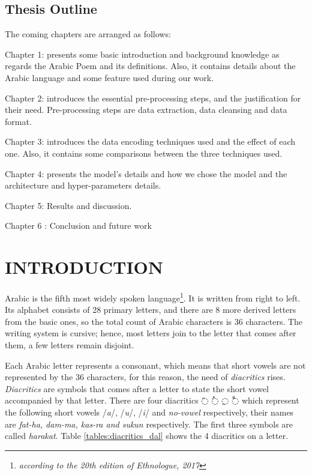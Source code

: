 
\section{Thesis Outline}

The coming chapters are arranged as follows:

Chapter 1: presents some basic introduction and  background knowledge as regards the Arabic Poem and its definitions. Also, it contains details about the Arabic language and some feature used during our work.
 
Chapter 2: introduces the essential pre-processing steps, and the justification for their need. Pre-processing steps are data extraction, data cleansing and data format.

Chapter 3: introduces the data encoding techniques used and the effect of each one. Also, it contains some comparisons between the three techniques used.

 Chapter 4: presents the model's details and how we chose the model and the architecture and hyper-parameters details.
 
 Chapter 5: Results and discussion.
 
 Chapter 6 : Conclusion and future work


 


\chapter{\uppercase{Introduction}}


Arabic is the fifth most widely spoken language\footnote{\textit{according to the
		20th edition of Ethnologue, 2017}}. It is written from right to left. Its
alphabet consists of 28 primary letters, and there are 8 more derived letters
from the basic ones, so the total count of Arabic characters is 36 characters.
The writing system is cursive; hence, most letters join to the letter that comes
after them, a few letters remain disjoint.

Each Arabic letter represents a consonant, which means that short vowels are not
represented by the 36 characters, for this reason, the need of \textit{diacritics}
rises. \textit{Diacritics} are symbols that comes after a letter to state the
short vowel accompanied by that letter. There are four diacritics \textarabic{◌َ} \textarabic{◌ُ}
\textarabic{◌ِ} \textarabic{◌ْ} which represent the following short vowels
/\textit{a}/, /\textit{u}/, /\textit{i}/ and \textit{no-vowel} respectively,
their names are \textit{fat-ha, dam-ma, kas-ra and sukun} respectively.  The first
three symbols are called \textit{harakat}. Table \ref{tables:diacritics_dal}
shows the 4 diacritics on a letter.



